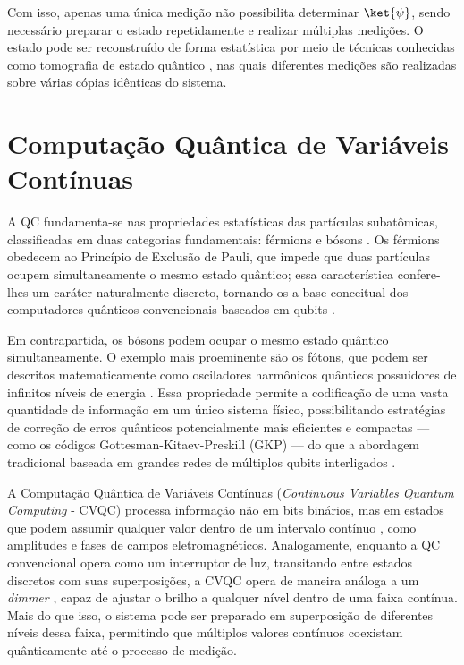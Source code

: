 Com isso, apenas uma única medição não possibilita determinar $\ket{\psi}$, sendo necessário preparar o estado repetidamente e realizar múltiplas medições. O estado pode ser reconstruído de forma estatística por meio de técnicas conhecidas como tomografia de estado quântico \cite{james2001measurement}, nas quais diferentes medições são realizadas sobre várias cópias idênticas do sistema.

\section{Computação Quântica de Variáveis Contínuas}\label{subsubsec:cvqc}

A QC fundamenta-se nas propriedades estatísticas das partículas 
subatômicas, classificadas em duas categorias fundamentais: férmions e bósons \cite{cohen2019quantum}. Os férmions obedecem ao Princípio de Exclusão de Pauli, que impede que duas partículas ocupem simultaneamente o mesmo estado quântico;  essa característica confere-lhes um caráter naturalmente discreto, tornando-os  a base conceitual dos computadores quânticos convencionais baseados em qubits \cite{sakurai2020modern}.

Em contrapartida, os bósons podem ocupar o mesmo estado quântico simultaneamente.  O exemplo mais proeminente são os fótons, que podem ser descritos matematicamente  como osciladores harmônicos quânticos possuidores de infinitos níveis de energia  \cite{braunstein2005quantum}. Essa propriedade permite a codificação de uma vasta quantidade de informação em um único sistema físico, possibilitando estratégias de correção de erros quânticos potencialmente mais eficientes e compactas — como os códigos Gottesman-Kitaev-Preskill (GKP) — do que a abordagem tradicional baseada em grandes redes de múltiplos qubits interligados \cite{gottesman2000encoding, weedbrook2012gaussian}.

A Computação Quântica de Variáveis Contínuas (\textit{Continuous Variables Quantum Computing} - CVQC) processa informação não em bits binários, mas em estados que podem assumir qualquer valor dentro de um intervalo contínuo \cite{braunstein2005quantum}, como amplitudes e fases de campos eletromagnéticos. Analogamente, enquanto a QC convencional opera como um interruptor de luz, transitando entre estados discretos com suas superposições, a CVQC opera de maneira análoga a um \textit{dimmer} \cite{lloyd1999quantum}, capaz de ajustar o brilho a qualquer nível dentro de uma faixa contínua. Mais do que isso, o sistema pode ser preparado em superposição de diferentes níveis dessa faixa, permitindo que múltiplos valores contínuos coexistam quânticamente até o processo de medição.

